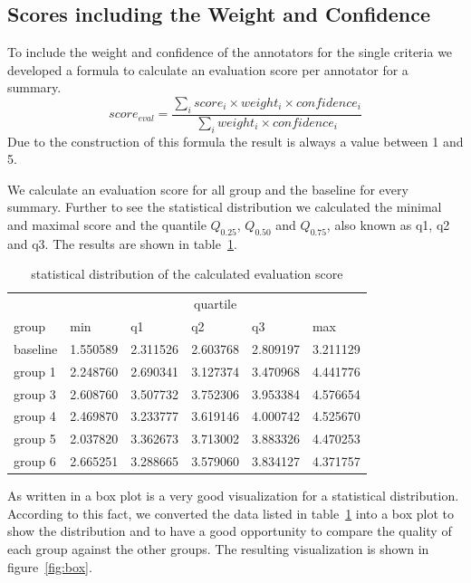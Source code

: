 \subsection{Scores including the Weight and Confidence}
\label{eva:box}
To include the weight and confidence of the annotators for the single criteria we developed a formula to calculate an evaluation score per annotator for a summary.
$$score_{eval} = \frac{\sum_i score_i \times weight_i \times confidence_i}{\sum_i weight_i \times confidence_i}$$
Due to the construction of this formula the result is always a value between 1 and 5.

We calculate an evaluation score for all group and the baseline for every summary.
Further to see the statistical distribution we calculated the minimal and maximal score and the quantile $Q_{0.25}$, $Q_{0.50}$ and $Q_{0.75}$, also known as q1, q2 and q3.
The results are shown in table~\ref{tab:evascore}.
\begin{table}[H]
	\begin{tabularx}{\textwidth}{X|XXXXX} \toprule
		         & \multicolumn{5}{c}{quartile}                         \\
		group    & min      & q1       & q2       & q3       & max      \\ \midrule
		baseline & 1.550589 & 2.311526 & 2.603768 & 2.809197 & 3.211129 \\
		group 1  & 2.248760 & 2.690341 & 3.127374 & 3.470968 & 4.441776 \\
		group 3  & 2.608760 & 3.507732 & 3.752306 & 3.953384 & 4.576654 \\
		group 4  & 2.469870 & 3.233777 & 3.619146 & 4.000742 & 4.525670 \\
		group 5  & 2.037820 & 3.362673 & 3.713002 & 3.883326 & 4.470253 \\
		group 6  & 2.665251 & 3.288665 & 3.579060 & 3.834127 & 4.371757 \\ \bottomrule
	\end{tabularx}
	\caption{statistical distribution of the calculated evaluation score}
	\label{tab:evascore}
\end{table}

As written in \citet{vis_mem} a box plot is a very good visualization for a statistical distribution.
According to this fact, we converted the data listed in table~\ref{tab:evascore} into a box plot to show the distribution and to have a good opportunity to compare the quality of each group against the other groups. The resulting visualization is shown in figure~\ref{fig:box}.

